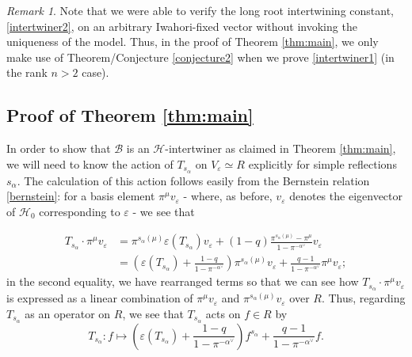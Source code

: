 \documentclass[11pt,letterpaper]{article}
\newcommand{\calH}{\mathcal{H}} %
\newcommand{\calB}{\mathcal{B}}
\newcommand{\ve}{\varepsilon}
\theoremstyle{remark}
\newtheorem*{remark}{Remark}
\numberwithin{equation}{section}
\begin{document}
\begin{remark}
Note that we were able to verify the long root intertwining constant, \eqref{intertwiner2}, on an arbitrary Iwahori-fixed vector without invoking the uniqueness of the model. Thus, in the proof of Theorem \ref{thm:main}, we only make use of Theorem/Conjecture \ref{conjecture2} when we prove \eqref{intertwiner1} (in the rank $n>2$ case).
\end{remark}

\subsection{Proof of Theorem \ref{thm:main}} \label{sec:proof}

In order to show that $\calB$ is an $\calH$-intertwiner as claimed in Theorem \ref{thm:main}, we will need to know the action of $T_{s_{\alpha}}$ on $V_{\ve} \simeq R$ explicitly for simple reflections $s_{\alpha}$. The calculation of this action follows easily from the Bernstein relation \eqref{bernstein}: for a basis element $\pi^{\mu}v_{\ve}$ - where, as before, $v_{\ve}$ denotes the eigenvector of $\calH_0$ corresponding to $\ve$ - we see that

\begin{align*}
T_{s_{\alpha}} \cdot \pi^{\mu}v_{\ve} &= \pi^{s_{\alpha}(\mu)} \ve(T_{s_{\alpha}})v_{\ve} + (1-q)\frac{\pi^{s_{\alpha}(\mu)}-\pi^{\mu}}{1-\pi^{-\alpha^{\vee}}}v_{\ve}
\\&= \left(\ve(T_{s_{\alpha}}) + \frac{1-q}{1-\pi^{-\alpha^{\vee}}}\right)\pi^{s_{\alpha}(\mu)}v_{\ve} + \frac{q-1}{1-\pi^{-\alpha^{\vee}}}\pi^{\mu}v_{\ve};
\end{align*}
in the second equality, we have rearranged terms so that we can see how $T_{s_{\alpha}}\cdot \pi^{\mu}v_{\ve}$ is expressed as a linear combination of $\pi^{\mu}v_{\ve}$ and $\pi^{s_{\alpha}(\mu)}v_{\ve}$ over $R$. Thus, regarding $T_{s_{\alpha}}$ as an operator on $R$, we see that $T_{s_{\alpha}}$ acts on $f \in R$ by \begin{equation}\label{heckeoperator} T_{s_{\alpha}}: f \mapsto \left(\ve(T_{s_{\alpha}}) + \frac{1-q}{1-\pi^{-\alpha^{\vee}}}\right)f^{s_{\alpha}} + \frac{q-1}{1-\pi^{-\alpha^{\vee}}}f.\end{equation}
\end{document}
